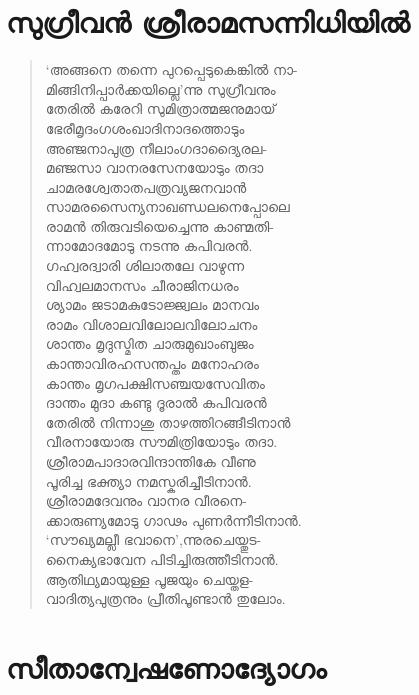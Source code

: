 
\section{സുഗ്രീവന്‍ ശ്രീരാമസന്നിധിയില്‍}

\begin{verse}
‘അങ്ങനെ തന്നെ പുറപ്പെടുകെങ്കില്‍ നാ-\\
മിങ്ങിനിപ്പാര്‍ക്കയില്ലെ’ന്നു സുഗ്രീവനും\\
തേരില്‍ കരേറി സുമിത്രാത്മജനുമായ്\\
ഭേരീമൃദംഗശംഖാദിനാദത്തൊടും\\
അഞ്ജനാപുത്ര നീലാംഗദാദ്യൈരല-\\
മഞ്ജസാ വാനരസേനയോടും തദാ\\
ചാമരശ്വേതാതപത്രവ്യജനവാന്‍\\
സാമരസൈന്യനാഖണ്ഡലനെപ്പോലെ\\
രാമന്‍ തിരുവടിയെച്ചെന്നു കാണ്മതി-\\
ന്നാമോദമോടു നടന്നു കപിവരന്‍.\\
ഗഹ്വരദ്വാരി ശിലാതലേ വാഴുന്ന\\
വിഹ്വലമാനസം ചീരാജിനധരം\\
ശ്യാമം ജടാമകുടോജ്ജ്വലം മാനവം\\
രാമം വിശാലവിലോലവിലോചനം\\
ശാന്തം മൃദുസ്മിത ചാരുമുഖാംബുജം\\
കാന്താവിരഹസന്തപ്തം മനോഹരം\\
കാന്തം മൃഗപക്ഷിസഞ്ചയസേവിതം\\
ദാന്തം മുദാ കണ്ടു ദൂരാല്‍ കപിവരന്‍\\
തേരില്‍ നിന്നാശു താഴത്തിറങ്ങീടിനാന്‍\\
വീരനായോരു സൗമിത്രിയോടും തദാ.\\
ശ്രീരാമപാദാരവിന്ദാന്തികേ വീണു\\
പൂരിച്ച ഭക്ത്യാ നമസ്കരിച്ചീടിനാന്‍.\\
ശ്രീരാമദേവനും വാനര വീരനെ-\\
ക്കാരുണ്യമോടു ഗാഢം പുണര്‍ന്നീടിനാന്‍.\\
‘സൗഖ്യമല്ലീ ഭവാനെ’,ന്നുരചെയ്തുട-\\
നൈക്യഭാവേന പിടിച്ചിരുത്തീടിനാന്‍.\\
ആതിഥ്യമായുള്ള പൂജയും ചെയ്തള-\\
വാദിത്യപുത്രനും പ്രീതിപൂണ്ടാന്‍ തുലോം.
\end{verse}


\section{സീതാന്വേഷണോദ്യോഗം}

